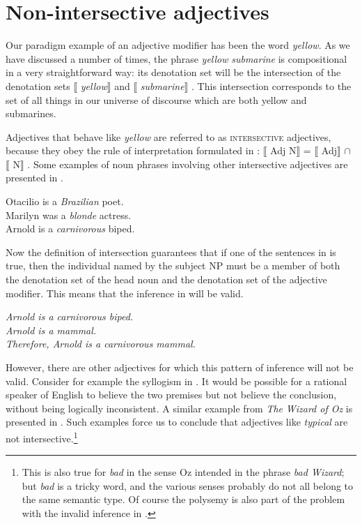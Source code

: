\section{Non-intersective adjectives}\label{sec:15.3}

Our paradigm example of an adjective modifier has been the word \textit{yellow}. As we have discussed a number of times, the phrase \textit{yellow} \textit{submarine} is compositional in a very straightforward way: its denotation set will be the intersection of the denotation sets $\llbracket$ \textit{yellow}$\rrbracket$  and $\llbracket$ \textit{submarine}$\rrbracket$ . This intersection corresponds to the set of all things in our universe of discourse which are both yellow and submarines.



Adjectives that behave like \textit{yellow} are referred to as \textsc{intersective} adjectives, because they obey the rule of interpretation formulated in : $\llbracket$ Adj N$\rrbracket$  = $\llbracket$ Adj$\rrbracket$  ${\cap}$ $\llbracket$ N$\rrbracket$ . Some examples of noun phrases involving other intersective adjectives are presented in .


\ea \label{ex:15.4}
\ea \label{ex:15.} Otacilio is a \textit{Brazilian} poet.\\
\ex Marilyn was a \textit{blonde} actress.\\
\ex Arnold is a \textit{carnivorous} biped.
                       \z
\z


Now the definition of intersection guarantees that if one of the sentences in  is true, then the individual named by the subject NP must be a member of both the denotation set of the head noun and the denotation set of the adjective modifier. This means that the inference in  will be valid.


\ea \label{ex:15.5}
\textit{Arnold is a carnivorous biped.}\\
\textit{Arnold is a mammal.\\
\FelixHRule
Therefore, Arnold is a carnivorous mammal.}
\z


However, there are other adjectives for which this pattern of inference will not be valid. Consider for example the syllogism in . It would be possible for a rational speaker of English to believe the two premises but not believe the conclusion, without being logically inconsistent. A similar example from \textit{The} \textit{Wizard of Oz} is presented in . Such examples force us to conclude that adjectives like \textit{typical} are not intersective.\footnote{This is also true for \textit{bad} in the sense Oz intended in the phrase \textit{bad Wizard}; but \textit{bad} is a tricky word, and the various senses probably do not all belong to the same semantic type. Of course the polysemy is also part of the problem with the invalid inference in .}


